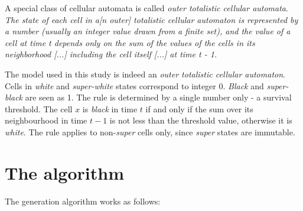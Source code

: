 \documentclass[a4paper, 11pt]{article} %
\begin{document}
A special class of cellular automata is called \emph{outer totalistic cellular automata}. \textit{The state of each cell in a[n outer] totalistic cellular automaton is represented by a number (usually an integer value drawn from a finite set), and the value of a cell at time t depends only on the sum of the values of the cells in its neighborhood [...] including the cell itself [...] at time t - 1.} \cite{wiki}

The model used in this study is indeed an \emph{outer totalistic cellular automaton}. Cells in \emph{white} and \emph{super-white} states correspond to integer 0. \emph{Black} and \emph{super-black} are seen as 1. The rule is determined by a single number only - a survival threshold. The cell $x$ is \emph{black} in time $t$ if and only if the sum over its neighbourhood in time $t - 1$ is not less than the threshold value, otherwise it is \emph{white}. The rule applies to non-\emph{super} cells only, since \emph{super} states are immutable.


\section*{The algorithm}

The generation algorithm works as follows:
\end{document}
